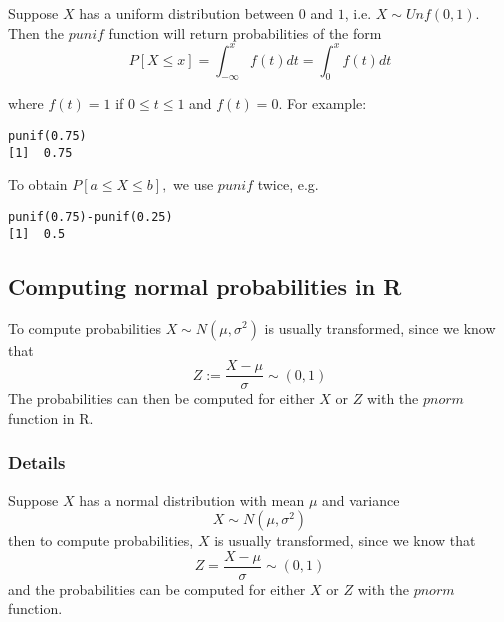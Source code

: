 \documentclass[12pt,a4paper]{article}
\theoremstyle{regla}
\theoremstyle{remark}
\theoremstyle{definition}
\theoremstyle{nonumberbreak}
\begin{document}
\begin{xmpl}

Suppose $X$ has a uniform distribution between $0$ and $1$, i.e. $X \sim Unf(0,1)$.  Then the $punif$ function will return probabilities of the form $$ P[X \leq x]= \int_{-\infty}^{x} f(t)dt= \int_{0}^{x} f(t)dt$$

where $f(t)=1$ if $0 \leq t \leq 1$
and $f(t)=0$.
For example:
\begin{lstlisting}
punif(0.75)
[1]  0.75
\end{lstlisting}

To obtain $P[a \leq X \leq b],$ we use $punif$ twice, e.g.
\begin{lstlisting}
punif(0.75)-punif(0.25)
[1]  0.5
\end{lstlisting}
\end{xmpl}


\subsection{Computing normal probabilities in R}
\begin{fbox}
\begin{minipage}{0.97\textwidth}
To compute probabilities $X\sim N(\mu,\sigma^2)$
is usually transformed, since we know that
$$
Z:=\frac{X-\mu}{\sigma} \sim(0,1)
$$
The probabilities can then be computed for either $X$ or $Z$ with the $pnorm$ function in R.
\end{minipage}
\end{fbox}
\subsubsection{Details}
Suppose $X$ has a normal distribution with mean $\mu$ and variance 
$$
X\sim N(\mu,\sigma^2)
$$
then to compute probabilities, $X$ is usually transformed, since we know that
$$
Z=\frac{X-\mu}{\sigma} \sim(0,1)
$$
and the probabilities can be computed for either $X$ or $Z$ with the $pnorm$ function.
\end{document}
